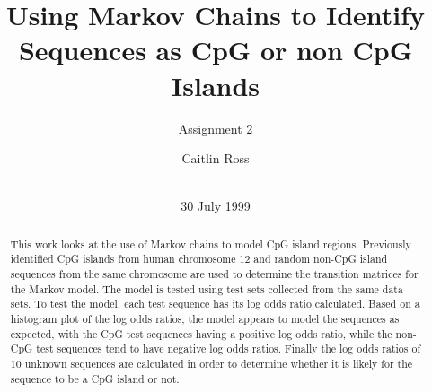 \documentclass{acm_proc_article-sp}
\begin{document}
\title{Using Markov Chains to Identify Sequences as CpG or non CpG Islands}
\subtitle{Assignment 2}
%
%
%
%
%

%
\author{
	\alignauthor Caitlin Ross\\
	 \\
}

\date{30 July 1999}

\maketitle

\begin{abstract}
This work looks at the use of Markov chains to model CpG island regions.  Previously identified CpG islands from human chromosome 12 and random non-CpG island sequences from the same chromosome are used to determine the transition matrices for the Markov model.  The model is tested using test sets collected from the same data sets.  To test the model, each test sequence has its log odds ratio calculated.  Based on a histogram plot of the log odds ratios, the model appears to model the sequences as expected, with the CpG test sequences having a positive log odds ratio, while the non-CpG test sequences tend to have negative log odds ratios.  Finally the log odds ratios of 10 unknown sequences are calculated in order to determine whether it is likely for the sequence to be a CpG island or not.  
\end{abstract}
\end{document}
